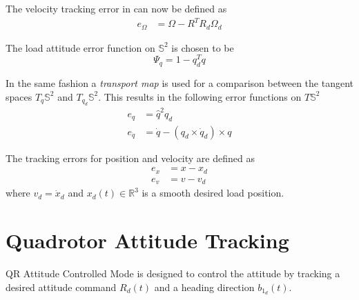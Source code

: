 %
The velocity tracking error in \BF  can now be defined as 
\begin{align}\label{key}
e_\Omega&=\Omega- R^TR_d\Omega_d
\end{align}

The load attitude error function on $ \mathbb{S}^2 $ is chosen to be 
\begin{equation}\label{eq:psiq}
\Psi_q=1-q_d^Tq
\end{equation}

In the same fashion a \textit{transport map} is used for a comparison between the tangent spaces $ T_q\mathbb{S}^2$ and $ T_{q_d}\mathbb{S}^2$. This results in the following error functions on $ T\mathbb{S}^2 $
\begin{align}
e_q&=\hat{q}^2q_d\label{eq:con.eq}\\
e_{\dot{q}}&=\dot{q}-(q_d\times\dot{q}_d)\times q\label{eq:con.edq}
\end{align}

The tracking errors for position and velocity are defined as
\begin{align}\label{key}
e_x&=x-x_d\\
e_v&=v-v_d
\end{align}
where $ v_d=\dot{x}_d $ and $ x_d(t) \in \mathbb{R}^3$ is a smooth desired load position.

\section{Quadrotor Attitude Tracking}\label{sec:con.qratt}
QR Attitude Controlled Mode is designed to control the  attitude by tracking a desired  attitude command $ R_d(t) $ and a heading direction $ b_{1_d}(t) $. 

